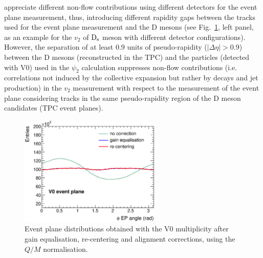 appreciate different non-flow contributions using different detectors
for the event plane measurement, thus, introducing different
rapidity gaps between the tracks used for the event plane measurement
and the D mesons (see Fig.~\ref{fig:QoverMCalibration}, left panel,
as an example for the $v_2$ of ${\rm D_s}$ meson with different detector configurations).
However, the separation of at least 0.9 units of pseudo-rapidity 
($|\Delta\eta|>0.9$) between the D mesons (reconstructed in the TPC)
and the particles (detected with V0) used in the $\psi_2$ calculation
suppresses non-flow contributions (i.e.\,correlations not 
induced by the collective expansion but rather by decays and 
jet production) in the $v_2$ measurement with respect
to the measurement of the event plane considering tracks in the same
pseudo-rapidity region of the D meson candidates (TPC event planes).
\\

\begin{figure}
\centering
 \includegraphics[width=0.6\textwidth]{FigCap5/V0EvPlaneDitrib.eps}
 \caption{Event plane distributions obtained with the V0 multiplicity after gain equalisation, re-centering and alignment corrections, using the $Q/M$ normalisation.}
   \label{fig:QoverMCalibration}
\end{figure}




